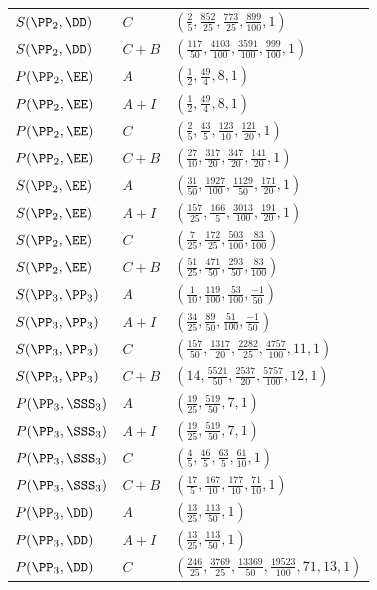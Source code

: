 \begin{longtable}{lll}
$S(\PP_2,\DD)$ & $C$ & $(\frac{2}{5}, \frac{852}{25}, \frac{773}{25}, \frac{899}{100}, 1)$ \\
$S(\PP_2,\DD)$ & $C+B$ & $(\frac{117}{50}, \frac{4103}{100}, \frac{3591}{100}, \frac{999}{100}, 1)$ \\
$P(\PP_2,\EE)$ & $A$ & $(\frac{1}{2}, \frac{49}{4}, 8, 1)$ \\
$P(\PP_2,\EE)$ & $A+I$ & $(\frac{1}{2}, \frac{49}{4}, 8, 1)$ \\
$P(\PP_2,\EE)$ & $C$ & $(\frac{2}{5}, \frac{43}{5}, \frac{123}{10}, \frac{121}{20}, 1)$ \\
$P(\PP_2,\EE)$ & $C+B$ & $(\frac{27}{10}, \frac{317}{20}, \frac{347}{20}, \frac{141}{20}, 1)$ \\
$S(\PP_2,\EE)$ & $A$ & $(\frac{31}{50}, \frac{1927}{100}, \frac{1129}{50}, \frac{171}{20}, 1)$ \\
$S(\PP_2,\EE)$ & $A+I$ & $(\frac{157}{25}, \frac{166}{5}, \frac{3013}{100}, \frac{191}{20}, 1)$ \\
$S(\PP_2,\EE)$ & $C$ & $(\frac{7}{25}, \frac{172}{25}, \frac{503}{100}, \frac{83}{100})$ \\
$S(\PP_2,\EE)$ & $C+B$ & $(\frac{51}{25}, \frac{471}{50}, \frac{293}{50}, \frac{83}{100})$ \\
$S(\PP_3,\PP_3)$ & $A$ & $(\frac{1}{10}, \frac{119}{100}, \frac{53}{100}, \frac{-1}{50})$ \\
$S(\PP_3,\PP_3)$ & $A+I$ & $(\frac{34}{25}, \frac{89}{50}, \frac{51}{100}, \frac{-1}{50})$ \\
$S(\PP_3,\PP_3)$ & $C$ & $(\frac{157}{50}, \frac{1317}{20}, \frac{2282}{25}, \frac{4757}{100}, 11, 1)$ \\
$S(\PP_3,\PP_3)$ & $C+B$ & $(14, \frac{5521}{50}, \frac{2537}{20}, \frac{5757}{100}, 12, 1)$ \\
$P(\PP_3,\SSS_3)$ & $A$ & $(\frac{19}{25}, \frac{519}{50}, 7, 1)$ \\
$P(\PP_3,\SSS_3)$ & $A+I$ & $(\frac{19}{25}, \frac{519}{50}, 7, 1)$ \\
$P(\PP_3,\SSS_3)$ & $C$ & $(\frac{4}{5}, \frac{46}{5}, \frac{63}{5}, \frac{61}{10}, 1)$ \\
$P(\PP_3,\SSS_3)$ & $C+B$ & $(\frac{17}{5}, \frac{167}{10}, \frac{177}{10}, \frac{71}{10}, 1)$ \\
$P(\PP_3,\DD)$ & $A$ & $(\frac{13}{25}, \frac{113}{50}, 1)$ \\
$P(\PP_3,\DD)$ & $A+I$ & $(\frac{13}{25}, \frac{113}{50}, 1)$ \\
$P(\PP_3,\DD)$ & $C$ & $(\frac{246}{25}, \frac{3769}{25}, \frac{13369}{50}, \frac{19523}{100}, 71, 13, 1)$ \\

\end{longtable}
